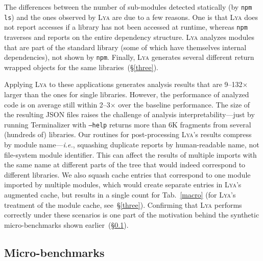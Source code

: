\documentclass[letterpaper,twocolumn,10pt]{article}
\def\ie{{\em i.e.}, }
\newcommand{\ttt}[1]{\texttt{#1}}
\newcommand{\sx}[1]{(\S\ref{#1})}
\newcommand{\sys}{{\scshape Lya}\xspace}
\begin{document}
The differences between the number of sub-modules detected statically (by \ttt{npm ls}) and the ones observed by \sys are due to a few reasons.
One is that \sys does not report accesses if a library has not been accessed at runtime, whereas \ttt{npm} traverses and reports on the entire dependency structure.
\sys analyzes modules that are part of the standard library (some of which have themselves internal dependencies),  not shown by \ttt{npm}.
Finally, \sys generates several different return wrapped objects for the same libraries~\sx{three}.

Applying \sys to these applications generates analysis results that are 9--132$\times$ larger than the ones for single libraries.
However, the performance of analyzed code is on average still within 2--3$\times$ over the baseline performance.
The size of the resulting JSON files raises the challenge of analysis interpretability---just by running Terminalizer with \ttt{--help} returns more than 6K fragments from several (hundreds of) libraries.
Our routines for post-processing \sys's results compress by module name---\ie squashing duplicate reports by human-readable name, not file-system module identifier.
This can affect the results of multiple imports with the same name at different parts of the tree that would indeed correspond to different libraries.
We also squash cache entries that correspond to one module imported by multiple modules, which would create separate entries in \sys's augmented cache, but results in a single count for Tab.~\ref{macro} (for \sys's treatment of the module cache, see~\S\ref{three}).
Confirming that \sys performs correctly under these scenarios is one part of the motivation behind the synthetic micro-benchmarks shown earlier~\sx{micro}.

\subsection{Micro-benchmarks}
\label{micro}
\end{document}
